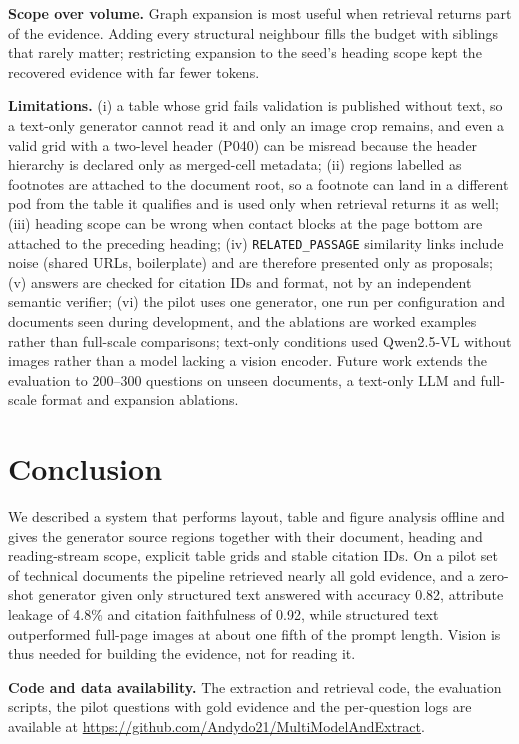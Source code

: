 \documentclass[conference]{IEEEtran}
\begin{document}
\textbf{Scope over volume.} Graph expansion is most useful when retrieval returns part of the evidence. Adding every structural neighbour fills the budget with siblings that rarely matter; restricting expansion to the seed's heading scope kept the recovered evidence with far fewer tokens.

\textbf{Limitations.}\label{sec:limitations} (i) a table whose grid fails validation is published without text, so a text-only generator cannot read it and only an image crop remains, and even a valid grid with a two-level header (P040) can be misread because the header hierarchy is declared only as merged-cell metadata; (ii) regions labelled as footnotes are attached to the document root, so a footnote can land in a different pod from the table it qualifies and is used only when retrieval returns it as well; (iii) heading scope can be wrong when contact blocks at the page bottom are attached to the preceding heading; (iv) \texttt{RELATED\_PASSAGE} similarity links include noise (shared URLs, boilerplate) and are therefore presented only as proposals; (v) answers are checked for citation IDs and format, not by an independent semantic verifier; (vi) the pilot uses one generator, one run per configuration and documents seen during development, and the ablations are worked examples rather than full-scale comparisons; text-only conditions used Qwen2.5-VL without images rather than a model lacking a vision encoder. Future work extends the evaluation to 200--300 questions on unseen documents, a text-only LLM and full-scale format and expansion ablations.

\section{Conclusion}
We described a system that performs layout, table and figure analysis offline and gives the generator source regions together with their document, heading and reading-stream scope, explicit table grids and stable citation IDs. On a pilot set of technical documents the pipeline retrieved nearly all gold evidence, and a zero-shot generator given only structured text answered with accuracy 0.82, attribute leakage of 4.8\% and citation faithfulness of 0.92, while structured text outperformed full-page images at about one fifth of the prompt length. Vision is thus needed for building the evidence, not for reading it.

\textbf{Code and data availability.} The extraction and retrieval code, the evaluation scripts, the pilot questions with gold evidence and the per-question logs are available at \url{https://github.com/Andydo21/MultiModelAndExtract}.



\end{document}
